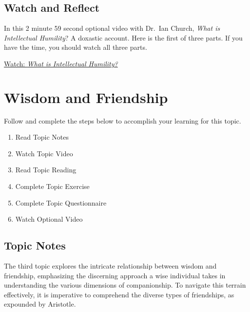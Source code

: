 \documentclass[
]{book}
\providecommand{\tightlist}{%
  \setlength{\itemsep}{0pt}\setlength{\parskip}{0pt}}
\begin{document}
\hypertarget{watch-and-reflect-3}{%
\subsection*{Watch and Reflect}\label{watch-and-reflect-3}}

\begin{reflect}
In this 2 minute 59 second optional video with Dr.~Ian Church, \emph{What is Intellectual Humility}? A doxastic account. Here is the first of three parts. If you have the time, you should watch all three parts.

\href{https://www.youtube.com/watch?v=8CZIkGEJYRY}{Watch: \emph{What is Intellectual Humility?}}
\end{reflect}

\hypertarget{wisdom-and-friendship}{%
\section{Wisdom and Friendship}\label{wisdom-and-friendship}}

Follow and complete the steps below to accomplish your learning for this topic.

\begin{enumerate}
\def\labelenumi{\arabic{enumi}.}
\tightlist
\item
  Read Topic Notes\\
\item
  Watch Topic Video\\
\item
  Read Topic Reading\\
\item
  Complete Topic Exercise\\
\item
  Complete Topic Questionnaire\\
\item
  Watch Optional Video
\end{enumerate}

\hypertarget{topic-notes-2}{%
\subsection*{Topic Notes}\label{topic-notes-2}}

The third topic explores the intricate relationship between wisdom and friendship, emphasizing the discerning approach a wise individual takes in understanding the various dimensions of companionship. To navigate this terrain effectively, it is imperative to comprehend the diverse types of friendships, as expounded by Aristotle.
\end{document}
